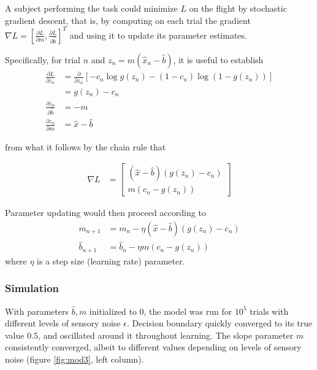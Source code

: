 A subject performing the task could minimize $L$ on the flight by stochastic gradient descent, that is, by computing on each trial the gradient $ \nabla L = \left[\frac{\partial L}{\partial m}, \frac{\partial L}{\partial \hat{b}} \right]^T $ and using it to update its parameter estimates.

Specifically, for trial $n$ and $z_n = m(\hat{x}_n-\hat{b})$, it is useful to establish
\begin{align}
     \frac{\partial L}{\partial z_n} &= \frac{\partial}{\partial z_n}\left[ -{c_n} \log g(z_n) -
    {(1-c_n)} \log \left(1-g(z_n)\right) \right] \nonumber \\
    &=   g(z_n) -c_n   \label{eq:dLdz} \\
    \frac{\partial z_n}{\partial \hat{b}} &= -m \\
    \frac{\partial z_n}{\partial m} &= \hat{x} - 
    \hat{b}
\end{align}

from what it follows by the chain rule that

\begin{align}
    \nabla L &=
    \begin{bmatrix}
    (\hat{x}-\hat{b}) (g(z_n) - c_n)   \\
    m (c_n - g(z_n))
    \end{bmatrix}
\end{align}

Parameter updating would then proceed according to
\begin{align}
    m_{n+1} &= m_{n} - \eta (\hat{x}-\hat{b}) (g(z_n) - c_n) \\
    \hat{b}_{n+1} &= \hat{b}_{n} - \eta m (c_n - g(z_n)) \label{eq:update_b}
\end{align}
where $\eta$ is a step size (learning rate) parameter.

\subsubsection{Simulation}
With parameters $\hat{b}, m$ initialized to $0$, the model was run for $10^5$ trials with different levels of sensory noise $\epsilon$.
Decision boundary quickly converged to its true value $0.5$, and oscillated around it throughout learning.
The slope parameter $m$ consistently converged, albeit to different values depending on levels of sensory noise (figure \ref{fig:mod3}, left column).


